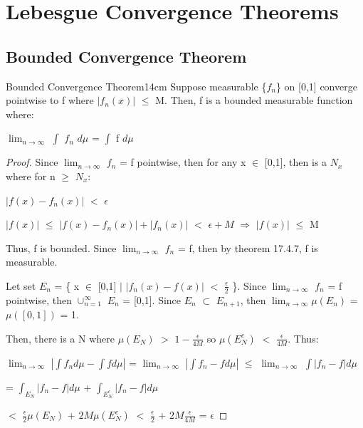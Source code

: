 \newpage

\section[Day 18: Convergence Theorems]{ Lebesgue Convergence Theorems }

\subsection{ Bounded Convergence Theorem }

    \begin{wtheorem}{Bounded Convergence Theorem}{14cm}
        Suppose measurable \{$f_n$\} on [0,1] converge pointwise to f where
        $|f_n(x)|$ $\leq$ M.
        Then, f is a bounded measurable function where:
        
        \hspace{0.5cm}
        $\lim_{n \rightarrow \infty}$ $\int$ $f_n$ $d\mu$ = $\int$ f $d\mu$
    \end{wtheorem}

    \begin{proof}
        Since $\lim_{n \rightarrow \infty}$ $f_n$ = f pointwise, then
        for any x $\in$ [0,1], then is a $N_x$ where for n $\geq$ $N_x$:

        \hspace{0.5cm}
        $|f(x) - f_n(x)|$ $<$ $\epsilon$

        \hspace{0.5cm}
        $|f(x)|$ $\leq$ $|f(x) - f_n(x)| + |f_n(x)|$ $<$ $\epsilon + M$
        \hspace{1cm}
        $\Rightarrow$
        \hspace{1cm}
        $|f(x)|$ $\leq$ M

        Thus, f is bounded.
        Since $\lim_{n \rightarrow \infty}$ $f_n$ = f, then by
        {\color{red} theorem 17.4.7}, f is measurable.

        Let set $E_n$ = \{ x $\in$ [0,1] $|$
                            $|f_n(x) - f(x)|$ $<$ $\frac{\epsilon}{2}$ \}.
        Since $\lim_{n \rightarrow \infty}$ $f_n$ = f pointwise, then
        $\cup_{n=1}^{\infty}$ $E_n$ = [0,1].
        Since $E_n$ $\subset$ $E_{n+1}$, then
        $\lim_{n \rightarrow \infty} \mu(E_n)$ = $\mu([0,1])$ = 1.

        Then, there is a N where $\mu(E_N)$ $>$ $1 - \frac{\epsilon}{4M}$
        so $\mu(E_N^c)$ $<$ $\frac{\epsilon}{4M}$. Thus:

        \hspace{0.5cm}
        $\lim_{n \rightarrow \infty}$ $|\int f_n d\mu - \int f d\mu|$
        = $\lim_{n \rightarrow \infty}$ $|\int f_n - f d\mu|$
        $\leq$ $\lim_{n \rightarrow \infty}$ $\int |f_n - f| d\mu$

        \hspace{5.25cm}
        = $\int_{E_N} |f_n - f| d\mu$ + $\int_{E_N^c} |f_n - f| d\mu$

        \hspace{5.25cm}
        $<$ $\frac{\epsilon}{2} \mu(E_N)$ + $2M \mu(E_N^c)$
        $<$ $\frac{\epsilon}{2}$ + $2M \frac{\epsilon}{4M}$
        = $\epsilon$
    \end{proof}

